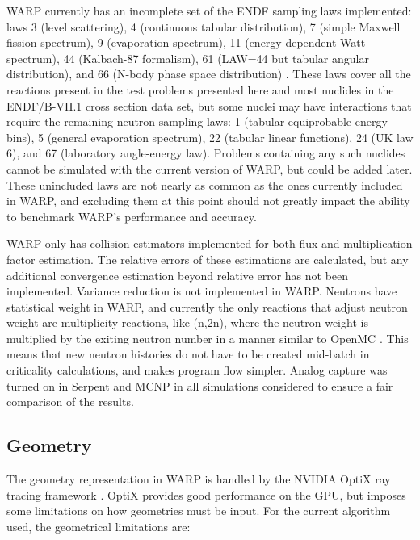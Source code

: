 \documentclass[preprint,12pt]{elsarticle}
\begin{document}
WARP currently has an incomplete set of the ENDF sampling laws implemented: laws 3 (level scattering), 4 (continuous tabular distribution), 7 (simple Maxwell fission spectrum), 9 (evaporation spectrum), 11 (energy-dependent Watt spectrum), 44 (Kalbach-87 formalism), 61 (LAW=44 but tabular angular distribution), and 66 (N-body phase space distribution) \cite{MCNP}.  These laws cover all the reactions present in the test problems presented here and most nuclides in the ENDF/B-VII.1 cross section data set, but some nuclei may have interactions that require the remaining neutron sampling laws: 1 (tabular equiprobable energy bins), 5 (general evaporation spectrum), 22 (tabular linear functions), 24 (UK law 6), and 67 (laboratory angle-energy law).  Problems containing any such nuclides cannot be simulated with the current version of WARP, but could be added later.  These unincluded laws are not nearly as common as the ones currently included in WARP, and excluding them at this point should not greatly impact the ability to benchmark WARP's performance and accuracy.

WARP only has collision estimators implemented for both flux and multiplication factor estimation.  The relative errors of these estimations are calculated, but any additional convergence estimation beyond relative error has not been implemented.  Variance reduction is not implemented in WARP.  Neutrons have statistical weight in WARP, and currently the only reactions that adjust neutron weight are multiplicity reactions, like (n,2n), where the neutron weight is multiplied by the exiting neutron number in a manner similar to OpenMC \cite{openmc}.  This means that new neutron histories do not have to be created mid-batch in criticality calculations, and makes program flow simpler.  Analog capture was turned on in Serpent and MCNP in all simulations considered to ensure a fair comparison of the results.  

\subsection{Geometry}

The geometry representation in WARP is handled by the NVIDIA OptiX ray tracing framework \cite{optix}.  OptiX provides good performance on the GPU, but imposes some limitations on how geometries must be input.  For the current algorithm used, the geometrical limitations are:
\end{document}

